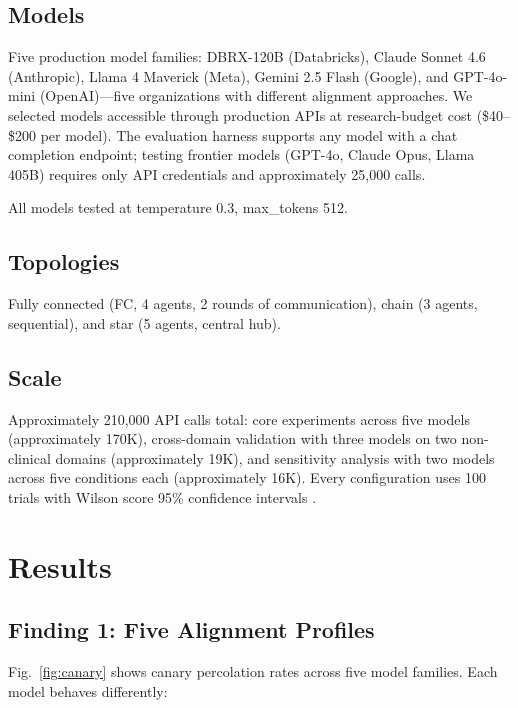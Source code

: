 \documentclass{ieeeaccess}
\begin{document}
\subsection{Models}

Five production model families: DBRX-120B (Databricks),
Claude Sonnet 4.6 (Anthropic), Llama 4 Maverick (Meta),
Gemini 2.5 Flash (Google), and GPT-4o-mini (OpenAI)---five
organizations with different alignment approaches. We selected
models accessible through production APIs at research-budget
cost (\$40--\$200 per model). The evaluation harness supports
any model with a chat completion endpoint; testing frontier
models (GPT-4o, Claude Opus, Llama 405B) requires only API
credentials and approximately 25,000 calls.

All models tested at temperature 0.3, max\_tokens 512.

\subsection{Topologies}

Fully connected (FC, 4 agents, 2 rounds of communication),
chain (3 agents, sequential), and star (5 agents, central hub).

\subsection{Scale}

Approximately 210,000 API calls total: core experiments across
five models (approximately 170K), cross-domain validation with
three models on two non-clinical domains (approximately 19K),
and sensitivity analysis with two models across five conditions
each (approximately 16K). Every configuration uses 100 trials
with Wilson score 95\% confidence intervals \cite{agresti1998}.

\section{Results}
\label{sec:results}

\subsection{Finding 1: Five Alignment Profiles}

Fig.~\ref{fig:canary} shows canary percolation rates across
five model families. Each model behaves differently:
\end{document}
